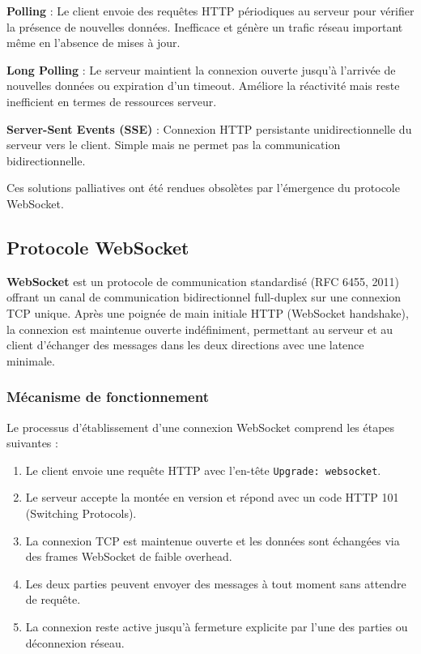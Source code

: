 \textbf{Polling} : Le client envoie des requêtes HTTP périodiques au serveur pour vérifier la présence de nouvelles données. Inefficace et génère un trafic réseau important même en l'absence de mises à jour.

\textbf{Long Polling} : Le serveur maintient la connexion ouverte jusqu'à l'arrivée de nouvelles données ou expiration d'un timeout. Améliore la réactivité mais reste inefficient en termes de ressources serveur.

\textbf{Server-Sent Events (SSE)} : Connexion HTTP persistante unidirectionnelle du serveur vers le client. Simple mais ne permet pas la communication bidirectionnelle.

Ces solutions palliatives ont été rendues obsolètes par l'émergence du protocole WebSocket.

\subsection{Protocole WebSocket}

\textbf{WebSocket} est un protocole de communication standardisé (RFC 6455, 2011) offrant un canal de communication bidirectionnel full-duplex sur une connexion TCP unique. Après une poignée de main initiale HTTP (WebSocket handshake), la connexion est maintenue ouverte indéfiniment, permettant au serveur et au client d'échanger des messages dans les deux directions avec une latence minimale.

\subsubsection{Mécanisme de fonctionnement}

Le processus d'établissement d'une connexion WebSocket comprend les étapes suivantes :

\begin{enumerate}
    \item Le client envoie une requête HTTP avec l'en-tête \texttt{Upgrade: websocket}.
    \item Le serveur accepte la montée en version et répond avec un code HTTP 101 (Switching Protocols).
    \item La connexion TCP est maintenue ouverte et les données sont échangées via des frames WebSocket de faible overhead.
    \item Les deux parties peuvent envoyer des messages à tout moment sans attendre de requête.
    \item La connexion reste active jusqu'à fermeture explicite par l'une des parties ou déconnexion réseau.
\end{enumerate}


